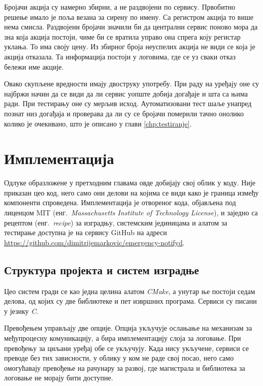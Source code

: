\documentclass[12pt,oneside]{memoir}
\begin{document}
Бројачи акција су намерно збирни, а не раздвојени по сервису. Првобитно решење имало је поља
везана за сирену по имену. Са регистром акција то више нема смисла. Раздвојени бројачи
значили би да централни сервис поново мора да зна која акција постоји, чиме би се вратила
управо она спрега коју регистар уклања. То има своју цену. Из збирног броја неуспелих акција 
не види се која је акција отказала. Та информација постоји у логовима, где се уз сваки отказ бележи име акције.

Овако скупљене вредности имају двоструку употребу. При раду на уређају оне су најбржи начин
да се види да ли сервис уопште добија догађаје и шта са њима ради. При тестирању оне су
мерљив исход. Аутоматизовани тест шаље унапред познат низ догађаја и проверава да ли су се
бројачи померили тачно онолико колико је очекивано, што је описано у глави
\ref{chp:testiranje}.

\chapter{Имплементација}
\label{chp:implementacija}
Одлуке образложене у претходним главама овде добијају свој облик у коду. Није приказан цео
код, него само они делови на којима се види како је граница између компоненти спроведена.
Имплементација је отвореног кода, објављена под лиценцом {\lat MIT}
(енг.\ \textit{Massachusetts Institute of Technology License}), и заједно са рецептом (енг.\ \textit{recipe}) за
изградњу, системским јединицама и алатом за тестирање доступна је на сервису {\lat GitHub}
на адреси \url{https://github.com/dimitrijemarkovic/emergency-notifyd}.

\section{Структура пројекта и систем изградње}
\label{sec:struktura}

Цео систем гради се као једна целина алатом \emph{CMake}, а унутар ње постоји седам
делова, од којих су две библиотеке и пет извршних програма. Сервиси су писани у језику
\emph{C}.

Превођењем управљају две опције. Опција  укључује ослањање на механизам за
међупроцесну комуникацију, а  бира имплементацију слоја за логовање. При
превођењу за циљани уређај обе се укључују. Када нису укључене, сервиси се преводе без тих
зависности, у облику у ком не раде свој посао, него само омогућавају превођење на рачунару
за развој, где магистрала и библиотека за логовање не морају бити доступне.
\end{document}
